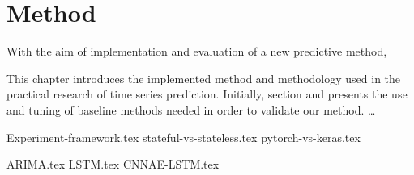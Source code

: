 \chapter{Method}
\label{section:Method}

With the aim of implementation and evaluation of a new predictive method,

This chapter introduces the implemented method and methodology used in the practical research of time series prediction.
Initially, section  and  presents the use and tuning of baseline methods needed in order to validate our method.
\dots

{Experiment-framework.tex}
{stateful-vs-stateless.tex}
{pytorch-vs-keras.tex}


{ARIMA.tex}
{LSTM.tex}
{CNNAE-LSTM.tex}
